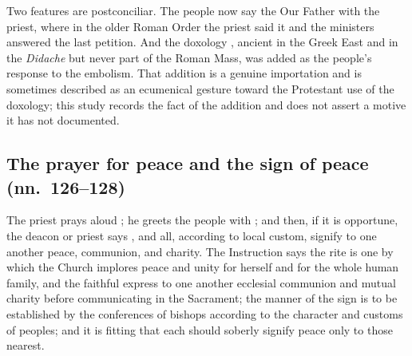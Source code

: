 Two features are postconciliar. The people now say the Our Father with the priest, where in the
older Roman Order the priest said it and the ministers answered the last petition. And the
doxology , ancient in the Greek East and in the \emph{Didache} but
never part of the Roman Mass, was added as the people's response to the embolism. That addition
is a genuine importation and is sometimes described as an ecumenical gesture toward the
Protestant use of the doxology; this study records the fact of the addition and does not assert
a motive it has not documented.

\subsection{The prayer for peace and the sign of peace (nn.\ 126--128)}

The priest prays aloud ; he greets the people with ; and then, if it is opportune, the deacon or priest says
, and all, according to local custom, signify to one another peace,
communion, and charity. The
Instruction says the rite is one by which the Church implores peace and unity for herself and
for the whole human family, and the faithful express to one another ecclesial communion and
mutual charity before communicating in the Sacrament; the manner of the sign is to be
established by the conferences of bishops according to the character and customs of peoples;
and it is fitting that each should soberly signify peace only to those nearest.

